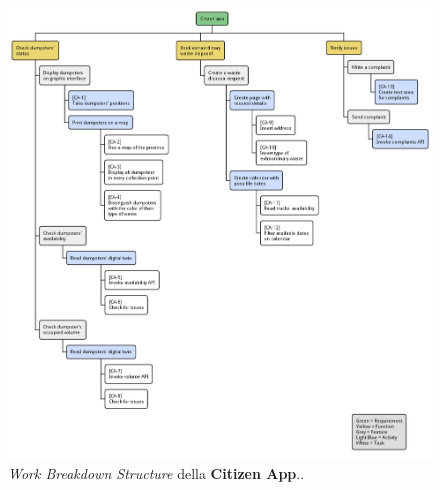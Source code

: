 \begin{figure}[H]
    \centering
    \includegraphics[width=\textwidth]{../img/wbs-citizen-app.pm}
    \caption{\textit{Work Breakdown Structure} della \textbf{Citizen App}..}
    \label{fig:wbs-citizen-app}
\end{figure}

